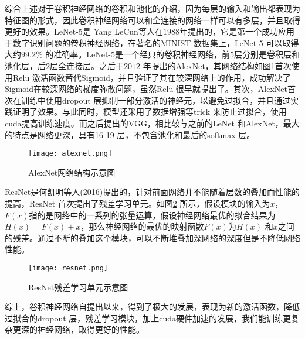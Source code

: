 综合上述对于卷积神经网络的卷积和池化的介绍，因为每层的输入和输出都表现为特征图的形式，因此卷积神经网络可以和全连接的网络一样可以有多层，并且取得更好的效果。LeNet-5\cite{lecun1998gradient-based}是
Yang LeCun等人在$1988$年提出的，它是第一个成功应用于数字识别问题的卷积神经网络，在著名的MINIST 数据集上，LeNet-5 可以取得大约$99.2\%$ 的准确率。LeNet-5是一个经典的卷积神经网络，前5层分别是卷积层和池化层，后2层全连接层。之后于$2012$ 年提出的AlexNet\cite{krizhevsky2012imagenet}，其网络结构如图\ref{fig:alexnet-example}首次使用Relu 激活函数替代Sigmoid，并且验证了其在较深网络上的作用，成功解决了Sigmoid在较深网络的梯度弥散问题，虽然Relu 很早就提出了。其次，AlexNet首次在训练中使用dropout 层抑制一部分激活的神经元，以避免过拟合，并且通过实践证明了效果。与此同时，模型还采用了数据增强等trick 来防止过拟合，使用cuda提高训练速度。而之后提出的VGG\cite{simonyan2015very}，相比较与之前的LeNet 和AlexNet，最大的特点是网络更深，具有16-19 层，不包含池化和最后的softmax 层。
\begin{figure}[htpb]
	\centering
	\texttt{[image: alexnet.png]}
    \caption{AlexNet网络结构示意图}
	\vspace*{-3.5mm}
	\label{fig:alexnet-example}
\end{figure}
ResNet\cite{he2016deep}是何凯明等人(2016)提出的，针对前面网络并不能随着层数的叠加而性能的提高，ResNet 首次提出了残差学习单元。如图\ref{fig:resnet-example} 所示，假设模块的输入为$x$，$F(x)$指的是网络中的一系列的张量运算，假设神经网络最优的拟合结果为$H(x) = F(x) + x$，那么神经网络的最优的映射函数$F(x)$为$H(x)$ 和$x$之间的残差。通过不断的叠加这个模块，可以不断堆叠加深网络的深度但是不降低网络性能。
\begin{figure}[htpb]
	\centering
	\texttt{[image: resnet.png]}
    \caption{ResNet残差学习单元示意图}
	\vspace*{-3.5mm}
	\label{fig:resnet-example}
\end{figure}

综上，卷积神经网络自提出以来，得到了极大的发展，表现为新的激活函数，降低过拟合的dropout 层，残差学习模块，加上cuda硬件加速的发展，我们能训练更复杂更深的神经网络，取得更好的性能。

